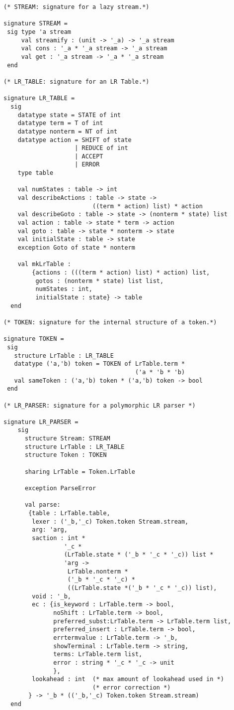 \begin{tt}
\begin{verbatim}
(* STREAM: signature for a lazy stream.*)

signature STREAM =
 sig type 'a stream
     val streamify : (unit -> '_a) -> '_a stream
     val cons : '_a * '_a stream -> '_a stream
     val get : '_a stream -> '_a * '_a stream
 end

(* LR_TABLE: signature for an LR Table.*)

signature LR_TABLE =
  sig
    datatype state = STATE of int
    datatype term = T of int
    datatype nonterm = NT of int
    datatype action = SHIFT of state
                    | REDUCE of int
                    | ACCEPT
                    | ERROR
    type table
        
    val numStates : table -> int
    val describeActions : table -> state ->
                         ((term * action) list) * action
    val describeGoto : table -> state -> (nonterm * state) list
    val action : table -> state * term -> action
    val goto : table -> state * nonterm -> state
    val initialState : table -> state
    exception Goto of state * nonterm

    val mkLrTable :
        {actions : (((term * action) list) * action) list,
         gotos : (nonterm * state) list list,
         numStates : int,
         initialState : state} -> table
  end

(* TOKEN: signature for the internal structure of a token.*)

signature TOKEN =
 sig
   structure LrTable : LR_TABLE
   datatype ('a,'b) token = TOKEN of LrTable.term *
                                     ('a * 'b * 'b)
   val sameToken : ('a,'b) token * ('a,'b) token -> bool
 end

(* LR_PARSER: signature for a polymorphic LR parser *)

signature LR_PARSER =
    sig
      structure Stream: STREAM
      structure LrTable : LR_TABLE
      structure Token : TOKEN

      sharing LrTable = Token.LrTable

      exception ParseError

      val parse:
       {table : LrTable.table,
        lexer : ('_b,'_c) Token.token Stream.stream,
        arg: 'arg,
        saction : int *
                 '_c *
                 (LrTable.state * ('_b * '_c * '_c)) list * 
                 'arg ->
                  LrTable.nonterm *
                  ('_b * '_c * '_c) *
                  ((LrTable.state *('_b * '_c * '_c)) list),
        void : '_b,
        ec : {is_keyword : LrTable.term -> bool,
              noShift : LrTable.term -> bool,
              preferred_subst:LrTable.term -> LrTable.term list,
              preferred_insert : LrTable.term -> bool,
              errtermvalue : LrTable.term -> '_b,
              showTerminal : LrTable.term -> string,
              terms: LrTable.term list,
              error : string * '_c * '_c -> unit
              },
        lookahead : int  (* max amount of lookahead used in *)
                         (* error correction *)
       } -> '_b * (('_b,'_c) Token.token Stream.stream)
  end
\end{verbatim}
\end{tt}

